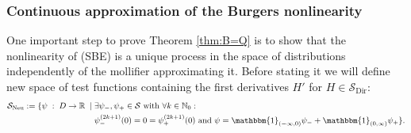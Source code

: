 \documentclass[a4paper, reqno, 12pt]{amsart}
\theoremstyle{plain}
\theoremstyle{definition}
\newcommand{\R}{\mathbb{R}}
\newcommand{\N}{\mathbb{N}}
\newcommand{\Sdir}{\mathcal{S}_{\text{Dir}}}
\begin{document}
\subsubsection{Continuous approximation of the Burgers nonlinearity} \label{sec:burgersapprox}
One important step to prove Theorem \ref{thm:B=Q} is  to show that the nonlinearity of (SBE) is a unique process in the space of distributions independently of the mollifier approximating it. Before stating it we will define new space of test functions containing the first derivatives $H'$ for $H\in\Sdir$: 
\begin{align*}
    \mathcal S_{\text{Neu}}:= \{ \psi \; : \;  D\to\R \; \mid \;  &\exists \psi_-,\psi_+\in\mathcal S\text{ with }\forall k\in\N_0: \\ & \psi_-^{(2k +1)}(0) = 0=\psi_+^{(2k +1)}(0)\text{ and } \psi =\mathbbm{1}_{(-\infty,0)}\psi_- +\mathbbm{1}_{(0,\infty)}\psi_+ \}.\\
\end{align*}
\end{document}
